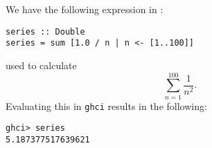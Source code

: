 
We have the following expression in : 
\scriptsize\begin{verbatim}
series :: Double
series = sum [1.0 / n | n <- [1..100]]
\end{verbatim}\normalsize
used to calculate
\[
    \sum_{n=1}^{100} \frac{1}{n^2}.
\]
Evaluating this in \verb|ghci| results in the following:
\scriptsize\begin{verbatim}
ghci> series
5.187377517639621
\end{verbatim}\normalsize
